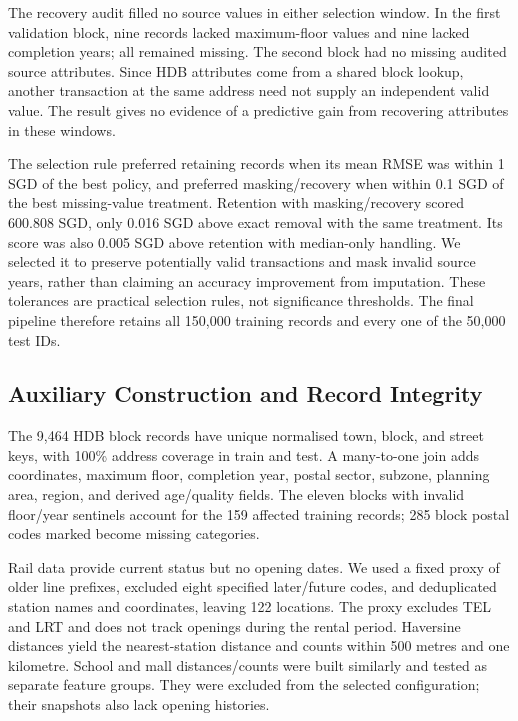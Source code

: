 \documentclass[conference]{IEEEtran}
\newcommand{\field}[1]{\texttt{\detokenize{#1}}}
\begin{document}
The recovery audit filled no source values in either selection window.
In the first validation block, nine records lacked maximum-floor values and
nine lacked completion years; all remained missing. The second block had no
missing audited source attributes. Since HDB attributes come from a shared
block lookup, another transaction at the same address need not supply an
independent valid value. The result gives no evidence of a predictive gain
from recovering attributes in these windows.

The selection rule preferred retaining records when its mean RMSE was within
1 SGD of the best policy, and preferred masking/recovery when within 0.1 SGD
of the best missing-value treatment. Retention with masking/recovery scored
600.808 SGD, only 0.016 SGD above exact removal with the same treatment.
Its score was also 0.005 SGD above retention with median-only handling.
We selected it to preserve potentially valid transactions and mask invalid
source years, rather than claiming an accuracy improvement from imputation.
These tolerances are practical selection rules, not significance thresholds.
The final pipeline therefore retains all 150,000 training records and every
one of the 50,000 test IDs.

\subsection{Auxiliary Construction and Record Integrity}
\label{sec:auxiliary_processing}
The 9,464 HDB block records have unique normalised town, block, and street
keys, with 100\% address coverage in train and test. A many-to-one join adds
coordinates, maximum floor, completion year, postal sector, subzone, planning
area, region, and derived age/quality fields. The eleven blocks with invalid
floor/year sentinels account for the 159 affected training records;
285 block postal codes marked \field{NIL} become missing categories.

Rail data provide current status but no opening dates. We used a fixed proxy
of older line prefixes, excluded eight specified later/future codes, and
deduplicated station names and coordinates, leaving 122 locations. The proxy
excludes TEL and LRT and does not track openings during the rental period.
Haversine distances yield the nearest-station distance and counts within
500 metres and one kilometre. School and mall distances/counts were built
similarly and tested as separate feature groups. They were excluded from the
selected configuration; their snapshots also lack opening histories.
\end{document}
